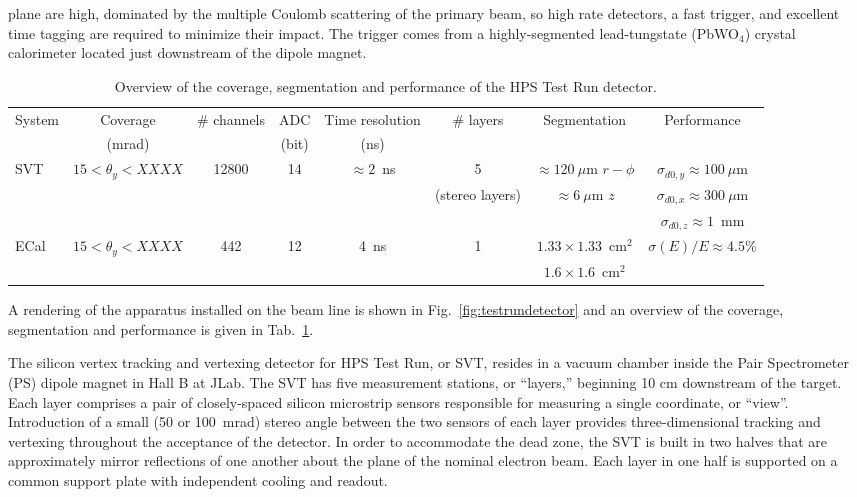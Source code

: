 \documentclass[final,3p,times,twocolumn]{elsarticle}
\begin{document}
plane are high, dominated by the
multiple Coulomb scattering of the primary beam, so high rate detectors, a fast trigger, 
and excellent time tagging are required to minimize their impact.  
The trigger comes from a highly-segmented  lead-tungstate (PbWO$_{4}$) crystal calorimeter located just 
downstream of the dipole magnet. 
\begin{center}
\begin{table}[t]
{\small
\caption{Overview of the coverage, segmentation and performance of the HPS Test Run detector. }
\begin{tabular}{lccccccc}
\hline 
System & Coverage & \# channels & ADC & Time resolution & \# layers & Segmentation & Performance \\
 & (mrad) &  & (bit) & (ns) &  &  &  \\
\hline
SVT & $15<\theta_{y} < XXXX$ & 12800 & 14 & $\approx 2$~ns & 5  & $\approx 120~\mu$m $r-\phi$ & $\sigma_{d0,y}  \approx 100~\mu$m \\
& &  &  &  & (stereo layers) & $\approx 6~\mu$m $z$ & $\sigma_{d0,x} \approx 300~\mu$m \\
& &  &  &  &  &  & $\sigma_{d0,z}\approx 1$~mm \\
\hline
ECal & $15<\theta_{y} < XXXX$ & 442 & 12 & 4~ns & 1 & $1.33\times1.33$~cm$^2$  & $\sigma(E)/E \approx 4.5\%$ \\ 
 &  &  &  &  &  & $1.6\times1.6$~cm$^2$  &  \\ 
\hline
\end{tabular}
\label{tab:detector-overview}
}
\end{table}
\end{center}
A rendering of the apparatus installed on the beam line is shown in 
Fig.~\ref{fig:testrundetector} and an overview of the coverage, segmentation and performance is 
given in Tab.~\ref{tab:detector-overview}.  

The silicon vertex tracking and vertexing detector for HPS Test Run, or SVT, resides in a vacuum 
chamber inside the Pair Spectrometer (PS) dipole magnet in Hall B at JLab. The SVT has five 
measurement stations, or ``layers,'' beginning 10 cm downstream of the target. Each layer 
comprises a pair of closely-spaced silicon microstrip sensors responsible for measuring a single 
coordinate, or ``view''. Introduction of a small (50 or 100~mrad) stereo angle between the two 
sensors of each layer provides three-dimensional tracking and vertexing throughout the acceptance 
of the detector. In order to accommodate the dead zone, the 
SVT is built in two halves that are approximately mirror reflections of one another about the plane of the 
nominal electron beam.  Each layer in one half is supported on a common support plate with 
independent cooling and readout. 
\end{document}
